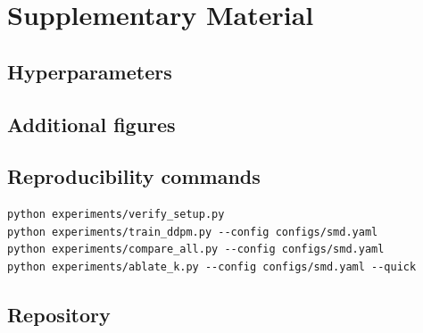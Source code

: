 \chapter{Supplementary Material}
\label{ch:appendix}

\section{Hyperparameters}

\section{Additional figures}

\section{Reproducibility commands}
\begin{verbatim}
python experiments/verify_setup.py
python experiments/train_ddpm.py --config configs/smd.yaml
python experiments/compare_all.py --config configs/smd.yaml
python experiments/ablate_k.py --config configs/smd.yaml --quick
\end{verbatim}

\section{Repository}
